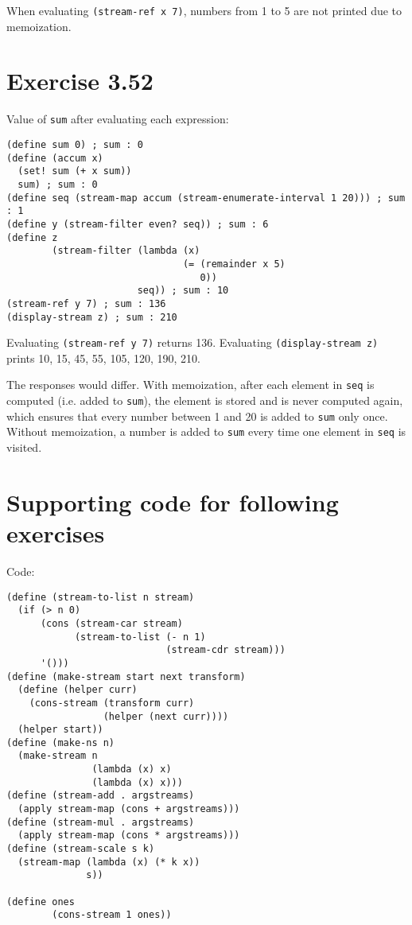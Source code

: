 \documentclass[../main.tex]{subfiles}
\begin{document}
When evaluating \lstinline{(stream-ref x 7)}, numbers from 1 to 5 are not printed due to memoization.

\section{Exercise 3.52}

Value of \lstinline{sum} after evaluating each expression:

\begin{lstlisting}
(define sum 0) ; sum : 0
(define (accum x)
  (set! sum (+ x sum))
  sum) ; sum : 0
(define seq (stream-map accum (stream-enumerate-interval 1 20))) ; sum : 1
(define y (stream-filter even? seq)) ; sum : 6
(define z
        (stream-filter (lambda (x)
                               (= (remainder x 5)
                                  0))
                       seq)) ; sum : 10
(stream-ref y 7) ; sum : 136
(display-stream z) ; sum : 210
\end{lstlisting}

Evaluating \lstinline{(stream-ref y 7)} returns 136. Evaluating \lstinline{(display-stream z)} prints 10, 15, 45, 55, 105, 120, 190, 210.

The responses would differ. With memoization, after each element in \lstinline{seq} is computed (i.e. added to \lstinline{sum}), the element is stored and is never computed again, which ensures that every number between 1 and 20 is added to \lstinline{sum} only once. Without memoization, a number is added to \lstinline{sum} every time one element in \lstinline{seq} is visited.

\section*{Supporting code for following exercises}

Code:

\begin{lstlisting}
(define (stream-to-list n stream)
  (if (> n 0)
      (cons (stream-car stream)
            (stream-to-list (- n 1)
                            (stream-cdr stream)))
      '()))
(define (make-stream start next transform)
  (define (helper curr)
    (cons-stream (transform curr)
                 (helper (next curr))))
  (helper start))
(define (make-ns n)
  (make-stream n
               (lambda (x) x)
               (lambda (x) x)))
(define (stream-add . argstreams)
  (apply stream-map (cons + argstreams)))
(define (stream-mul . argstreams)
  (apply stream-map (cons * argstreams)))
(define (stream-scale s k)
  (stream-map (lambda (x) (* k x))
              s))

(define ones
        (cons-stream 1 ones))
\end{lstlisting}
\end{document}
